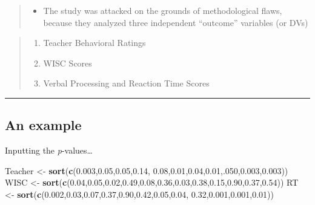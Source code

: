 \documentclass[]{article}
\newenvironment{Shaded}{\begin{snugshade}}{\end{snugshade}}
\newcommand{\DecValTok}[1]{\textcolor[rgb]{0.00,0.00,0.81}{#1}}
\newcommand{\FloatTok}[1]{\textcolor[rgb]{0.00,0.00,0.81}{#1}}
\newcommand{\KeywordTok}[1]{\textcolor[rgb]{0.13,0.29,0.53}{\textbf{#1}}}
\newcommand{\NormalTok}[1]{#1}
\newcommand{\StringTok}[1]{\textcolor[rgb]{0.31,0.60,0.02}{#1}}
\providecommand{\tightlist}{%
  \setlength{\itemsep}{0pt}\setlength{\parskip}{0pt}}
\begin{document}
\begin{quote}
\begin{itemize}
\tightlist
\item
  The study was attacked on the grounds of methodological flaws, because
  they analyzed three independent ``outcome'' variables (or DVs)
\end{itemize}
\end{quote}

\begin{quote}
\begin{enumerate}
\def\labelenumi{\arabic{enumi}.}
\tightlist
\item
  Teacher Behavioral Ratings
\item
  WISC Scores
\item
  Verbal Processing and Reaction Time Scores
\end{enumerate}
\end{quote}

\begin{center}\rule{0.5\linewidth}{\linethickness}\end{center}

\hypertarget{an-example-1}{%
\subsection{An example}\label{an-example-1}}

Inputting the \emph{p}-values\ldots{}

\begin{Shaded}
\begin{Highlighting}[]
\NormalTok{Teacher <-}\StringTok{ }\KeywordTok{sort}\NormalTok{(}\KeywordTok{c}\NormalTok{(}\FloatTok{0.003}\NormalTok{,}\FloatTok{0.05}\NormalTok{,}\FloatTok{0.05}\NormalTok{,}\FloatTok{0.14}\NormalTok{, }\FloatTok{0.08}\NormalTok{,}\FloatTok{0.01}\NormalTok{,}\FloatTok{0.04}\NormalTok{,}\FloatTok{0.01}\NormalTok{,.}\DecValTok{050}\NormalTok{,}\FloatTok{0.003}\NormalTok{,}\FloatTok{0.003}\NormalTok{))}
\NormalTok{WISC <-}\StringTok{ }\KeywordTok{sort}\NormalTok{(}\KeywordTok{c}\NormalTok{(}\FloatTok{0.04}\NormalTok{,}\FloatTok{0.05}\NormalTok{,}\FloatTok{0.02}\NormalTok{,}\FloatTok{0.49}\NormalTok{,}\FloatTok{0.08}\NormalTok{,}\FloatTok{0.36}\NormalTok{,}\FloatTok{0.03}\NormalTok{,}\FloatTok{0.38}\NormalTok{,}\FloatTok{0.15}\NormalTok{,}\FloatTok{0.90}\NormalTok{,}\FloatTok{0.37}\NormalTok{,}\FloatTok{0.54}\NormalTok{))}
\NormalTok{RT <-}\StringTok{ }\KeywordTok{sort}\NormalTok{(}\KeywordTok{c}\NormalTok{(}\FloatTok{0.002}\NormalTok{,}\FloatTok{0.03}\NormalTok{,}\FloatTok{0.07}\NormalTok{,}\FloatTok{0.37}\NormalTok{,}\FloatTok{0.90}\NormalTok{,}\FloatTok{0.42}\NormalTok{,}\FloatTok{0.05}\NormalTok{,}\FloatTok{0.04}\NormalTok{, }\FloatTok{0.32}\NormalTok{,}\FloatTok{0.001}\NormalTok{,}\FloatTok{0.001}\NormalTok{,}\FloatTok{0.01}\NormalTok{))}
\end{Highlighting}
\end{Shaded}
\end{document}
